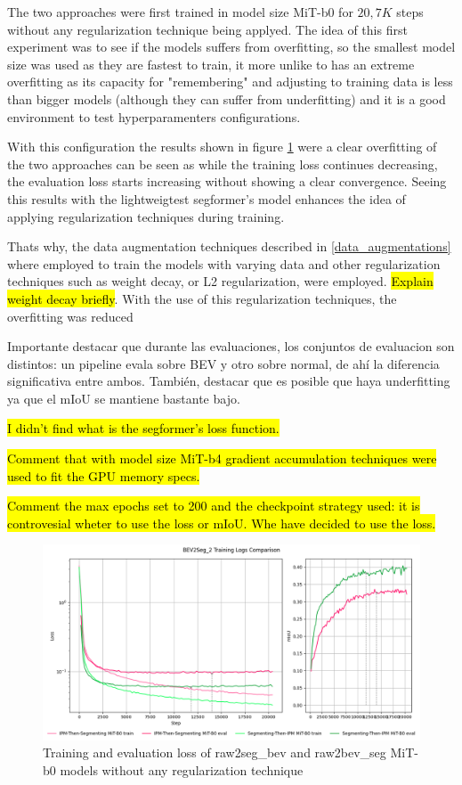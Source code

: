 The two approaches were first trained in model size MiT-b0 for $20,7K$ steps without any regularization technique being applyed. The idea of this first experiment was to see if the models suffers from overfitting, so the smallest model size was used as they are fastest to train, it more unlike to has an extreme overfitting as its capacity for "remembering" and adjusting to training data is less than bigger models (although they can suffer from underfitting) and it is a good environment to test hyperparamenters configurations.


With this configuration the results shown in figure \ref{fig:overfitting_mit-b0} were a clear overfitting of the two approaches can be seen as while the training loss continues decreasing, the evaluation loss starts increasing without showing a clear convergence. Seeing this results with the lightweigtest segformer's model enhances the idea of applying regularization techniques during training. 

Thats why, the data augmentation techniques described in \ref{data_augmentations} where employed to train the models with varying data and other regularization techniques such as weight decay, or L2 regularization, were employed. \hl{Explain weight decay briefly}. With the use of this regularization techniques, the overfitting was reduced


Importante destacar que durante las evaluaciones, los conjuntos de evaluacion son distintos: un pipeline evala sobre BEV y otro sobre normal, de ahí la diferencia significativa entre ambos. También, destacar que es posible que haya underfitting ya que el mIoU se mantiene bastante bajo.


\hl{I didn't find what is the segformer's loss function.}

\hl{Comment that with model size MiT-b4 gradient accumulation techniques were used to fit the GPU memory specs.}

\hl{Comment the max epochs set to 200 and the checkpoint strategy used: it is controvesial wheter to use the loss or mIoU. Whe have decided to use the loss.}



\begin{figure}[h!]
    \centering
    \includegraphics[width=\linewidth]{./images/experiments/overfitting_bev_nu.png}
    \caption{Training and evaluation loss of raw2seg\_bev and raw2bev\_seg MiT-b0 models without any regularization technique}
    \label{fig:overfitting_mit-b0}
\end{figure}






